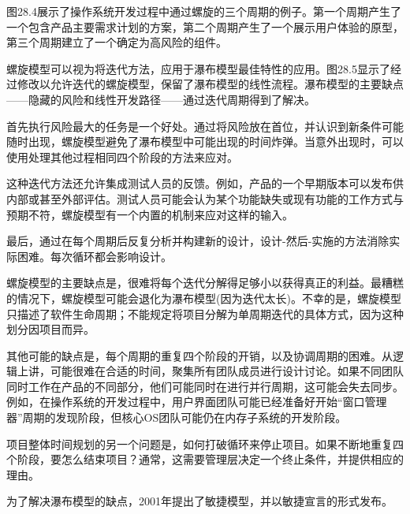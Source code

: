 
图28.4展示了操作系统开发过程中通过螺旋的三个周期的例子。第一个周期产生了一个包含产品主要需求计划的方案，第二个周期产生了一个展示用户体验的原型，第三个周期建立了一个确定为高风险的组件。



螺旋模型可以视为将迭代方法，应用于瀑布模型最佳特性的应用。图28.5显示了经过修改以允许迭代的螺旋模型，保留了瀑布模型的线性流程。瀑布模型的主要缺点——隐藏的风险和线性开发路径——通过迭代周期得到了解决。


首先执行风险最大的任务是一个好处。通过将风险放在首位，并认识到新条件可能随时出现，螺旋模型避免了瀑布模型中可能出现的时间炸弹。当意外出现时，可以使用处理其他过程相同四个阶段的方法来应对。

这种迭代方法还允许集成测试人员的反馈。例如，产品的一个早期版本可以发布供内部或甚至外部评估。测试人员可能会认为某个功能缺失或现有功能的工作方式与预期不符，螺旋模型有一个内置的机制来应对这样的输入。

最后，通过在每个周期后反复分析并构建新的设计，设计-然后-实施的方法消除实际困难。每次循环都会影响设计。


螺旋模型的主要缺点是，很难将每个迭代分解得足够小以获得真正的利益。最糟糕的情况下，螺旋模型可能会退化为瀑布模型(因为迭代太长)。不幸的是，螺旋模型只描述了软件生命周期；不能规定将项目分解为单周期迭代的具体方式，因为这种划分因项目而异。

其他可能的缺点是，每个周期的重复四个阶段的开销，以及协调周期的困难。从逻辑上讲，可能很难在合适的时间，聚集所有团队成员进行设计讨论。如果不同团队同时工作在产品的不同部分，他们可能同时在进行并行周期，这可能会失去同步。例如，在操作系统的开发过程中，用户界面团队可能已经准备好开始“窗口管理器”周期的发现阶段，但核心OS团队可能仍在内存子系统的开发阶段。

项目整体时间规划的另一个问题是，如何打破循环来停止项目。如果不断地重复四个阶段，要怎么结束项目？通常，这需要管理层决定一个终止条件，并提供相应的理由。


为了解决瀑布模型的缺点，2001年提出了敏捷模型，并以敏捷宣言的形式发布。

